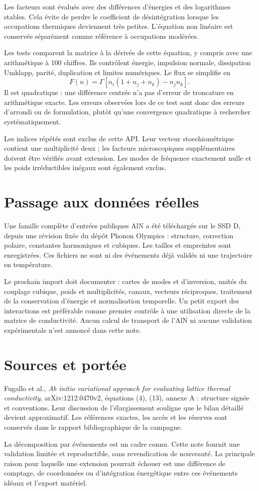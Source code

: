\documentclass[11pt,a4paper]{article}
\begin{document}
Les facteurs sont évalués avec des différences d'énergies et des logarithmes
stables. Cela évite de perdre le coefficient de désintégration lorsque les
occupations thermiques deviennent très petites.
L'équation non linéaire est conservée séparément comme référence à
occupations modérées.

Les tests comparent la matrice à la dérivée de cette équation, y compris
avec une arithmétique à 100 chiffres. Ils contrôlent énergie, impulsion
normale, dissipation Umklapp, parité, duplication et limites numériques.
Le flux se simplifie en
\[
 F(n)=\Gamma[n_i(1+n_j+n_k)-n_jn_k].
\]
Il est quadratique : une différence centrée n'a pas d'erreur de troncature
en arithmétique exacte. Les erreurs observées lors de ce test sont donc
des erreurs d'arrondi ou de formulation, plutôt qu'une convergence
quadratique à rechercher systématiquement.

Les indices répétés sont exclus de cette API. Leur vecteur
stoechiométrique contient une multiplicité deux ; les facteurs
microscopiques supplémentaires doivent être vérifiés avant extension.
Les modes de fréquence exactement nulle et les poids irréductibles
inégaux sont également exclus.

\section{Passage aux données réelles}
Une famille complète d'entrées publiques AlN a été téléchargée sur le
SSD D, depuis une révision fixée du dépôt Phonon Olympics :
structure, correction polaire, constantes harmoniques et cubiques.
Les tailles et empreintes sont enregistrées. Ces fichiers ne sont
ni des événements déjà validés ni une trajectoire en température.

Le prochain import doit documenter : cartes de modes et d'inversion,
unités du couplage cubique, poids et multiplicités, canaux, vecteurs
réciproques, traitement de la conservation d'énergie et normalisation
temporelle. Un petit export des interactions est préférable comme
premier contrôle à une utilisation directe de la matrice de conductivité.
Aucun calcul de transport de l'AlN ni aucune validation expérimentale
n'est annoncé dans cette note.

\section{Sources et portée}
Fugallo et al., \emph{Ab initio variational approach for evaluating lattice
thermal conductivity}, arXiv:1212.0470v2, équations (4), (13), annexe A :
structure signée et conventions. Leur discussion de l'élargissement
souligne que le bilan détaillé devient approximatif.
Les références exactes, les accès et les réserves sont conservés dans
le rapport bibliographique de la campagne.

La décomposition par événements est un cadre connu. Cette note fournit
une validation limitée et reproductible, sans revendication de nouveauté.
La principale raison pour laquelle une extension pourrait échouer est
une différence de comptage, de coordonnées ou d'intégration énergétique
entre ces événements idéaux et l'export matériel.
\end{document}

